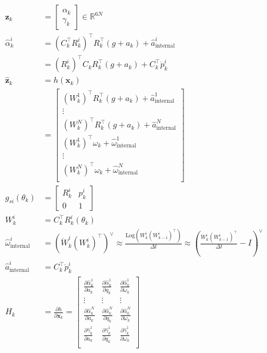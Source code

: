 \documentclass[11pt]{article}
\newcommand{\pd}[2]{\frac{\partial #1}{\partial #2}} %
\begin{document}
\begin{align*}
    \mathbf{z}_k &= \begin{bmatrix}
        \alpha_k \\ \gamma_k
    \end{bmatrix} \in \mathbb{R}^{6N} \\
    \hat{\alpha}_k^i &= (C_k^\top R_k^i)^\top R_k^\top (g + a_k) + \hat{a}^i_{\text{internal}} \\
    &= (R_k^i)^\top C_k R_k^\top (g + a_k) + C_k^\top \ddot{p}_k^i \\
    \hat{\mathbf{z}}_k &= h(\mathbf{x}_k) \\
    &= \begin{bmatrix}
        (W_k^1)^\top R_k^\top (g + a_k) + \hat{a}^1_{\text{internal}} \\
        \vdots \\
        (W_k^N)^\top R_k^\top (g + a_k) + \hat{a}^N_{\text{internal}} \\
        (W_k^1)^\top \omega_k + \hat{\omega}^1_{\text{internal}} \\
        \vdots \\
        (W_k^N)^\top \omega_k + \hat{\omega}^N_{\text{internal}} \\
    \end{bmatrix} \\
    g_{si}(\theta_k) &= \begin{bmatrix}
        R_k^i & p_k^i \\
        0 & 1
    \end{bmatrix} \\
    W_k^i &= C_k^\top R_k^i(\theta_k) \\
    \hat{\omega}^i_{\text{internal}} &= \left(\dot{W}^i_k(W_k^i)^\top\right)^\vee \approx \frac{\text{Log}\left(W_k^i(W_{k-1}^i)^\top\right)}{\Delta t} \approx \left(\frac{W_k^i(W_{k-1}^i)^\top}{\Delta t} - I\right)^\vee \\
    \hat{a}^i_{\text{internal}} &= C_k^\top \ddot{p}_k^i \\
    H_k &= \pd{h}{\mathbf{x}_k} = \begin{bmatrix}
        \pd{\hat{\alpha}^1_k}{a_k} & \pd{\hat{\alpha}^1_k}{q_k} & \pd{\hat{\alpha}^1_k}{\omega_k} \\
        \vdots & \vdots & \vdots \\
        \pd{\hat{\alpha}^N_k}{a_k} & \pd{\hat{\alpha}^N_k}{q_k} & \pd{\hat{\alpha}^N_k}{\omega_k} \\
        \pd{\hat{\gamma}^1_k}{a_k} & \pd{\hat{\gamma}^1_k}{q_k} & \pd{\hat{\gamma}^1_k}{\omega_k} \\

\end{bmatrix}
\end{align*}
\end{document}
